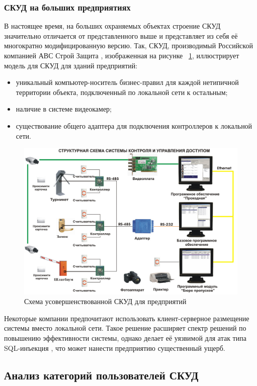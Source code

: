\subsubsection {СКУД на больших предприятиях}
В настоящее время, на больших охраняемых объектах строение СКУД значительно отличается от представленного выше и представляет из себя её многократно модифицированную версию. Так, СКУД, производимый Российской компанией \textquotedbl АВС Строй Защита \textquotedbl, изображенная на рисунке ~\ref{fig:bigskud}, иллюстрирует модель для СКУД для зданий предприятий:
\begin{itemize}
	\item уникальный компьютер-носитель бизнес-правил для каждой нетипичной территории объекта, подключенный по локальной сети к остальным;
	\item наличие в системе видеокамер;
	\item существование общего адаптера для подключения контроллеров к локальной сети.
\end{itemize}

\begin{figure}[H]
	\centering
	\includegraphics[width=1\linewidth]{images/BigSkud}
	\caption{Схема усовершенствованной СКУД для предприятий}
	\label{fig:bigskud}
\end{figure}

Некоторые компании предпочитают использовать клиент-серверное размещение системы вместо локальной сети. Такое решение расширяет спектр решений по повышению эффективности системы, однако делает её уязвимой для атак типа \textquotedbl SQL-инъекция \textquotedbl, что может нанести предприятию существенный ущерб.
\subsection{Анализ категорий пользователей СКУД}

